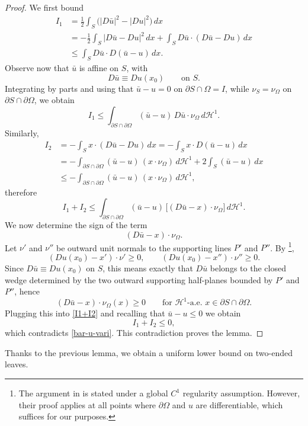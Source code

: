 \documentclass[reqno,11pt]{amsart}
\numberwithin{equation}{section}
\theoremstyle{remark}
\begin{document}
\begin{proof}
We first bound
\begin{align*}
I_1
&=\frac12\int_S \bigl(|D\bar u|^2-|Du|^2\bigr)\,dx\\
&=-\frac12\int_S |D\bar u-Du|^2\,dx+\int_S D\bar u\cdot(D\bar u-Du)\,dx\\
&\le \int_S D\bar u\cdot D(\bar u-u)\,dx.
\end{align*}
Observe now that $\bar u$ is affine on $S$, with
\[
D\bar u\equiv Du(x_0)\qquad\text{on }S.
\]
Integrating by parts and using that $\bar u-u=0$ on
$\partial S\cap\Omega=I$, while $\nu_S=\nu_\Omega$ on
$\partial S\cap\partial\Omega$, we obtain
\[
I_1
\le \int_{\partial S\cap \partial\Omega}(\bar u-u)\,D\bar u\cdot\nu_\Omega\,
d\mathscr H^1.
\]
Similarly,
\begin{align*}
I_2
&=-\int_S x\cdot(D\bar u-Du)\,dx
= -\int_S x\cdot D(\bar u-u)\,dx\\
&=-\int_{\partial S\cap\partial\Omega}(\bar u-u)\,(x\cdot\nu_\Omega)\,
d\mathscr H^1
+2\int_S (\bar u-u)\,dx\\
&\le -\int_{\partial S\cap\partial\Omega}(\bar u-u)\,(x\cdot\nu_\Omega)\,
d\mathscr H^1,
\end{align*}
therefore
\begin{equation}\label{I1+I2}
I_1+I_2\le \int_{\partial S\cap\partial\Omega}(\bar u-u)\,
\bigl[(D\bar u-x)\cdot \nu_\Omega\bigr]\,d\mathscr H^1.
\end{equation}
We now determine the sign of the term
\[
(D\bar u-x)\cdot\nu_\Omega.
\]
Let $\nu'$ and $\nu''$ be outward unit normals to the supporting lines $P'$ and $P''$. By \cite[Proposition~2.3]{MRZ20252}\footnote{The argument in \cite{MRZ20252} is stated under a global $C^1$ regularity assumption. However, their proof applies at all points where $\partial\Omega$ and $u$ are differentiable, which suffices for our purposes.},
\[
(Du(x_0)-x')\cdot\nu'\ge0,
\qquad
(Du(x_0)-x'')\cdot\nu''\ge0.
\]
Since $D\bar u\equiv Du(x_0)$ on $S$, this means exactly that $D\bar u$ belongs
to the closed wedge determined by the two outward supporting half-planes
bounded by $P'$ and $P''$, hence
\[
(D\bar u-x)\cdot \nu_\Omega(x)\ge0
\qquad\text{for }\mathscr H^1\text{-a.e.\ }x\in \partial S\cap \partial\Omega.
\]
Plugging this into \eqref{I1+I2} and recalling that $\bar u-u\le0$ we obtain
\[
I_1+I_2\le0,
\]
which contradicts \eqref{bar-u-vari}. This contradiction proves the lemma.
\end{proof}

Thanks to the previous lemma, we obtain a uniform lower bound on two-ended leaves.
\end{document}
